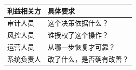 \begin{tabular}{@{}P{4.0cm}P{8.5cm}@{}}
\toprule
\textbf{利益相关方} & \textbf{具体要求} \\
\midrule
审计人员 & 这个决策依据什么？ \\
风控人员 & 谁授权了这个操作？ \\
运营人员 & 从哪一步恢复才可靠？ \\
系统负责人 & 改了什么，是否确有改善？ \\
\bottomrule
\end{tabular}

